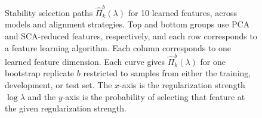 \begin{figure}
  \centering
  \caption{Stability selection paths $\hat{\Pi}_{k}^{b}\left(\lambda\right)$ for
    10 learned features, across models and alignment strategies. Top and bottom
    groups use PCA and SCA-reduced features, respectively, and each row
    corresponds to a feature learning algorithm. Each column corresponds to one
    learned feature dimension. Each curve gives
    $\hat{\Pi}_{k}^{b}\left(\lambda\right)$ for one bootstrap replicate $b$
    restricted to samples from either the training, development, or test set.
    The $x$-axis is the regularization strength $\log \lambda$ and the $y$-axis
    is the probability of selecting that feature at the given regularization
    strength.}
  \label{fig:selection_paths-5-2}
\end{figure}
